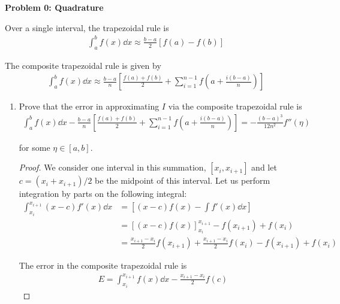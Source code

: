 \textbf{Problem 0: Quadrature}

Over a single interval, the trapezoidal rule is
\begin{align}
    \int_a^b f(x) \dd{x} \approx \frac{b-a}{2} [f(a)-f(b)]
\end{align}

The composite trapezoidal rule is given by
\begin{align}
    \int_a^b f(x) \dd{x} \approx \frac{b-a}{n}
    \left[ \frac{f(a) + f(b)}{2} + \sum_{i=1}^{n-1} f\left( a + \frac{i(b-a)}{n} \right) \right]
\end{align}

\begin{enumerate}[label=(\alph*),leftmargin=*,itemsep=0mm]
    
    \item Prove that the error in approximating $I$ via the composite trapezoidal rule is
    \begin{align*}
        \int_a^b f(x) \dd{x} - \frac{b-a}{n}
        \left[ \frac{f(a) + f(b)}{2} + \sum_{i=1}^{n-1} f\left( a + \frac{i(b-a)}{n} \right) \right]
        = -\frac{(b-a)^3}{12n^2} f''(\eta)
    \end{align*}
    
    for some $\eta \in [a,b]$.
    
    \begin{proof}
        
        We consider one interval in this summation, $[x_i,x_{i+1}]$ and let $c=(x_i+x_{i+1})/2$ be the midpoint of this interval.  Let us perform integration by parts on the following integral:
        \begin{align*}
            \int_{x_i}^{x_{i+1}} (x-c) f'(x) \dd{x}
            &= \left[ (x-c)f(x) - \int f'(x) \dd{x} \right] \\
            &= [(x-c)f(x)]_{x_i}^{x_{i+1}} - f(x_{i+1}) + f(x_i) \\
            &= \frac{x_{i+1}-x_i}{2} f(x_{i+1}) + \frac{x_{i+1}-x_i}{2} f(x_{i})
            - f(x_{i+1}) + f(x_i)
        \end{align*}
        
        The error in the composite trapezoidal rule is
        \begin{align*}
            E = \int_{x_i}^{x_{i+1}} f(x) \dd{x} - \frac{x_{i+1}-x_i}{2}f(c)
        \end{align*}
        
    \end{proof}
    

\end{enumerate}
